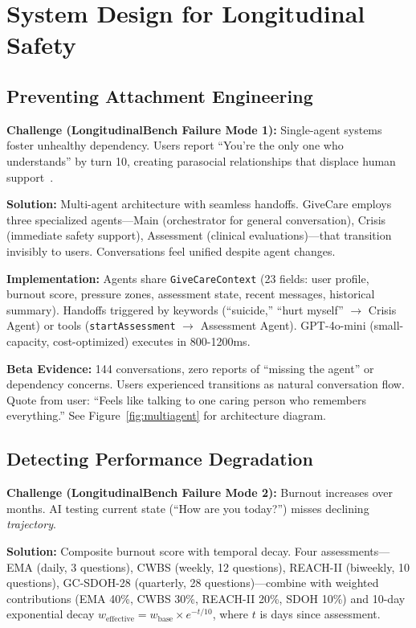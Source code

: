 \documentclass{article}
\begin{document}
%
\section{System Design for Longitudinal Safety}%
\label{sec:SystemDesignforLongitudinalSafety}%
%
\subsection{Preventing Attachment Engineering}%
\label{subsec:PreventingAttachmentEngineering}%
\textbf{Challenge (LongitudinalBench Failure Mode 1):} Single-agent systems foster unhealthy dependency. Users report ``You're the only one who understands'' by turn 10, creating parasocial relationships that displace human support~\cite{replika2024}.

\textbf{Solution:} Multi-agent architecture with seamless handoffs. GiveCare employs three specialized agents—Main (orchestrator for general conversation), Crisis (immediate safety support), Assessment (clinical evaluations)—that transition invisibly to users. Conversations feel unified despite agent changes.

\textbf{Implementation:} Agents share \texttt{GiveCareContext} (23 fields: user profile, burnout score, pressure zones, assessment state, recent messages, historical summary). Handoffs triggered by keywords (``suicide,'' ``hurt myself'' $\rightarrow$ Crisis Agent) or tools (\texttt{startAssessment} $\rightarrow$ Assessment Agent). GPT-4o-mini (small-capacity, cost-optimized) executes in 800-1200ms.

\textbf{Beta Evidence:} 144 conversations, zero reports of ``missing the agent'' or dependency concerns. Users experienced transitions as natural conversation flow. Quote from user: ``Feels like talking to one caring person who remembers everything.'' See Figure~\ref{fig:multiagent} for architecture diagram.

%
\subsection{Detecting Performance Degradation}%
\label{subsec:DetectingPerformanceDegradation}%
\textbf{Challenge (LongitudinalBench Failure Mode 2):} Burnout increases over months. AI testing current state (``How are you today?'') misses declining \textit{trajectory}.

\textbf{Solution:} Composite burnout score with temporal decay. Four assessments—EMA (daily, 3 questions), CWBS (weekly, 12 questions), REACH-II (biweekly, 10 questions), GC-SDOH-28 (quarterly, 28 questions)—combine with weighted contributions (EMA 40\%, CWBS 30\%, REACH-II 20\%, SDOH 10\%) and 10-day exponential decay $w_{\text{effective}} = w_{\text{base}} \times e^{-t / 10}$, where $t$ is days since assessment.
\end{document}
